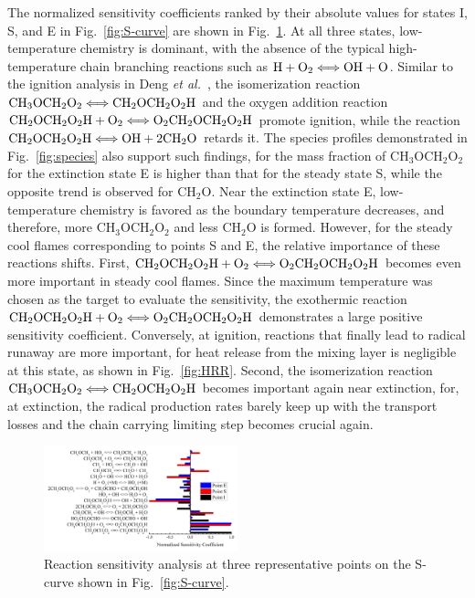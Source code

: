 \documentclass[review,3p,times]{elsarticle}
\begin{document}
The normalized sensitivity coefficients ranked by their absolute values for states I, S, and E in Fig.~\ref{fig:S-curve} are shown in Fig.~\ref{fig:SA}.  At all three states, low-temperature chemistry is dominant, with the absence of the typical high-temperature chain branching reactions such as $\rm{H} + \rm{O}_2 \Longleftrightarrow \rm{OH} + \rm{O}$.  Similar to the ignition analysis in Deng \emph{et al.}~\cite{deng14}, the isomerization reaction $\rm{CH}_3\rm{OCH}_2\rm{O}_2 \Longleftrightarrow \rm{CH}_2\rm{OCH}_2\rm{O}_2\rm{H}$ and the oxygen addition reaction $\rm{CH}_2\rm{OCH}_2\rm{O}_2\rm{H} + \rm{O}_2 \Longleftrightarrow \rm{O}_2\rm{CH}_2\rm{OCH}_2\rm{O}_2\rm{H}$ promote ignition, while the reaction $\rm{CH}_2\rm{OCH}_2\rm{O}_2\rm{H} \Longleftrightarrow \rm{OH} + 2\rm{CH}_2\rm{O}$ retards it.  \textcolor{Rev1}{The species profiles demonstrated in Fig.~\ref{fig:species} also support such findings, for the mass fraction of CH$_3$OCH$_2$O$_2$ for the extinction state E is higher than that for the steady state S, while the opposite trend is observed for CH$_2$O. Near the extinction state E, low-temperature chemistry is favored as the boundary temperature decreases, and therefore, more CH$_3$OCH$_2$O$_2$ and less CH$_2$O is formed.}  However, for the steady cool flames corresponding to points S and E, the relative importance of these reactions shifts.  First, $\rm{CH}_2\rm{OCH}_2\rm{O}_2\rm{H} + \rm{O}_2 \Longleftrightarrow \rm{O}_2\rm{CH}_2\rm{OCH}_2\rm{O}_2\rm{H}$ becomes even more important in steady cool flames.  Since the maximum temperature was chosen as the target to evaluate the sensitivity, the exothermic reaction $\rm{CH}_2\rm{OCH}_2\rm{O}_2\rm{H} + \rm{O}_2 \Longleftrightarrow \rm{O}_2\rm{CH}_2\rm{OCH}_2\rm{O}_2\rm{H}$ demonstrates a large positive sensitivity coefficient.  Conversely, at ignition, reactions that finally lead to radical runaway are more important, for heat release from the mixing layer is negligible at this state, as shown in Fig.~\ref{fig:HRR}.  Second, the isomerization reaction $\rm{CH}_3\rm{OCH}_2\rm{O}_2 \Longleftrightarrow \rm{CH}_2\rm{OCH}_2\rm{O}_2\rm{H}$ becomes important again near extinction, for, at extinction, the radical production rates barely keep up with the transport losses and the chain carrying limiting step becomes crucial again.

\begin{figure}[t]
  \centering
  \scriptsize
  \includegraphics[width=0.5\textwidth]{SA.png}
  \normalsize
  \caption{Reaction sensitivity analysis at three representative points on the S-curve shown in Fig.~\ref{fig:S-curve}.}
  \label{fig:SA}
\end{figure}
\end{document}
